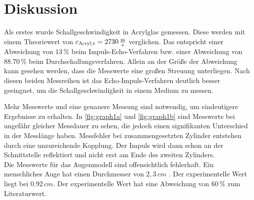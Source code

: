 \section{Diskussion}
\label{sec:Diskussion}
Als erstes wurde Schallgeschwindigkeit in Acrylglas gemessen.
Diese werden mit einem Theoriewert von
$c_{\text{Acryl},\text{t}} = 2730 \,\unit{\frac{\meter}{\second}} $ verglichen.
Das entspricht einer Abweichung von $13 \, \%$ beim Impuls-Echo-Verfahren bzw. einer Abweichung von $88.70 \, \%$ beim Durchschallungsverfahren. 
Allein an der Größe der Abweichung kann gesehen werden, dass die Messwerte eine großen Streuung unterliegen. Nach diesen beiden Messreihen ist das Echo-Impuls-Verfahren deutlich besser geeingnet, um die Schallgeschwindigkeit in einem Medium zu messen.

Mehr Messwerte und eine genauere Messung sind notwendig, um eindeutigere Ergebnisse zu erhalten.
In \autoref{fig:graph1a} und \autoref{fig:graph1b} sind Messwerte bei ungefähr gleicher Messdauer zu sehen, die jedoch einen signifikanten Unterschied in der Messlänge haben.
Messfehler bei zusammengesetzten Zylinder entstehen durch eine unzureichende Kopplung. Der Impuls wird dann schon an der Schnittstelle reflektiert und nicht erst am Ende des zweiten Zylinders. \\

Die Messwerte für das Augenmodell sind offensichtlich fehlerhaft. Ein menschliches Auge hat einen Durchmesser von $ 2,3 \, \unit{cm} $ \cite{ap07}. Der experimentelle Wert liegt bei $ 0.92 \, \unit{cm}$.
Der experimentelle Wert hat eine Abweichung von $ 60 \, \% $ zum Literaturwert.